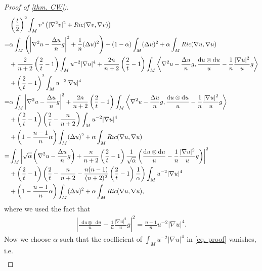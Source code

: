 \documentclass[11pt]{amsart}
\numberwithin{equation}{section}
\numberwithin{lemma}{section}
\numberwithin{proposition}{section}
\numberwithin{corollary}{section}
\numberwithin{remark}{section}
\newcommand{\dd}{\mathop{}\!\mathrm{d}}%
\begin{document}
\begin{proof}[Proof of \cref{thm. CW}:]
\begin{align}
      & \left(\frac{t}{2}\right)^2
     \int_{M} v^s
     \left(|\nabla^2 v|^2
     +Ric(\nabla v,\nabla v)
     \right)\notag\\=&\alpha
     \int_M \left(\left|\nabla^2 u-\frac{\Delta u}{n}g\right|^2+\frac{1}{n}(\Delta u)^2\right)
     +(1-\alpha)\int_M (\Delta u)^2
     +\alpha\int_M Ric(\nabla u,\nabla u)\notag
     \\
     &+\frac{2}{n+2}\left(\frac{2}{t}-1\right)
     \int_M u^{-2}|\nabla u|^4
     +\frac{2n}{n+2}\left(\frac{2}{t}-1\right)
     \int_M \left\langle\nabla^2 u-\frac{\Delta u}{n}g,\frac{\dd u\otimes \dd u}{u}-\frac{1}{n}\frac{|\nabla u|^2}{u}g\right\rangle\notag\\
     &+\left(\frac{2}{t}-1\right)^2
     \int_M u^{-2}|\nabla u|^4\notag\\
     =&\alpha\int_M \left|\nabla^2 u-\frac{\Delta u}{n}g\right|^2
     +\frac{2n}{n+2}\left(\frac{2}{t}-1\right)
     \int_M \left\langle\nabla^2 u-\frac{\Delta u}{n}g,\frac{\dd u\otimes \dd u}{u}-\frac{1}{n}\frac{|\nabla u|^2}{u}g\right\rangle\notag\\
     &+\left(\frac{2}{t}-1\right)
     \left(\frac{2}{t}-\frac{n}{n+2}\right)
     \int_M u^{-2}|\nabla u|^4\notag\\
     &+\left(1-\frac{n-1}{n}\alpha\right)\int_M (\Delta u)^2
     +\alpha\int_M Ric(\nabla u,\nabla u)\notag\\
     =&\int_M \left|\sqrt{\alpha}
     \left(\nabla^2 u-\frac{\Delta u}{n}g\right)
     +\frac{n}{n+2}
     \left(\frac{2}{t}-1\right)
     \frac{1}{\sqrt{\alpha}}
     \left(
     \frac{\dd u\otimes \dd u}{u}-\frac{1}{n}\frac{|\nabla u|^2}{u}g
     \right)
     \right|^2\notag\\
     &+\left(\frac{2}{t}-1\right)
     \left(
     \frac{2}{t}-\frac{n}{n+2}
     -\frac{n(n-1)}{(n+2)^2}
     \left(\frac{2}{t}-1\right)
     \frac{1}{\alpha}
     \right)\int_M u^{-2}|\nabla u|^4\notag\\
     &+\left(1-\frac{n-1}{n}\alpha\right)\int_M (\Delta u)^2
     +\alpha\int_M Ric(\nabla u,\nabla u),
     \label{eq. proof}
 \end{align}
 where we used the fact that 
 \begin{align*}
     \left|\frac{\dd u\otimes \dd u}{u}-\frac{1}{n}\frac{|\nabla u|^2}{u}g\right|^2=\frac{n-1}{n}u^{-2}|\nabla u|^4.
 \end{align*}
 Now we choose $\alpha$ such that the coefficient of $\int_M u^{-2}|\nabla u|^4$ in \cref{eq. proof} vanishes, i.e.
 \begin{align*}

\end{align*}
\end{proof}
\end{document}
